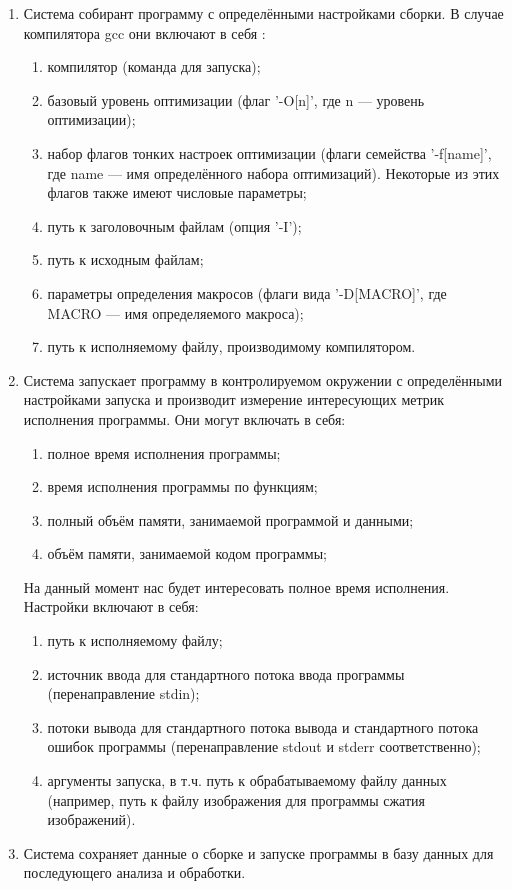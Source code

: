 \begin{enumerate}
	\item Система собирант программу с определёнными настройками сборки. В случае компилятора gcc они включают в себя \cite{gcc-options}:

	\begin{enumerate}
		\item компилятор (команда для запуска);
		\item базовый уровень оптимизации (флаг '-O[n]', где n --- уровень оптимизации);
		\item набор флагов тонких настроек оптимизации (флаги семейства '-f[name]', где name --- имя определённого набора оптимизаций). Некоторые из этих флагов также имеют числовые параметры;
		\item путь к заголовочным файлам (опция '-I');
		\item путь к исходным файлам;
		\item параметры определения макросов (флаги вида '-D[MACRO]', где MACRO --- имя определяемого макроса);
		\item путь к исполняемому файлу, производимому компилятором.
	\end{enumerate}

	\item Система запускает программу в контролируемом окружении с определёнными настройками запуска и производит измерение интересующих метрик исполнения программы. Они могут включать в себя:

	\begin{enumerate}
		\item полное время исполнения программы;
		\item время исполнения программы по функциям;
		\item полный объём памяти, занимаемой программой и данными;
		\item объём памяти, занимаемой кодом программы;
	\end{enumerate}

	На данный момент нас будет интересовать полное время исполнения.
	Настройки включают в себя:

	\begin{enumerate}
		\item путь к исполняемому файлу;
		\item источник ввода для стандартного потока ввода программы (перенаправление stdin);
		\item потоки вывода для стандартного потока вывода и стандартного потока ошибок программы (перенаправление stdout и stderr соответственно);
		\item аргументы запуска, в т.ч. путь к обрабатываемому файлу данных (например, путь к файлу изображения для программы сжатия изображений).

	\end{enumerate}

	\item Система сохраняет данные о сборке и запуске программы в базу данных для последующего анализа и обработки.
\end{enumerate}
